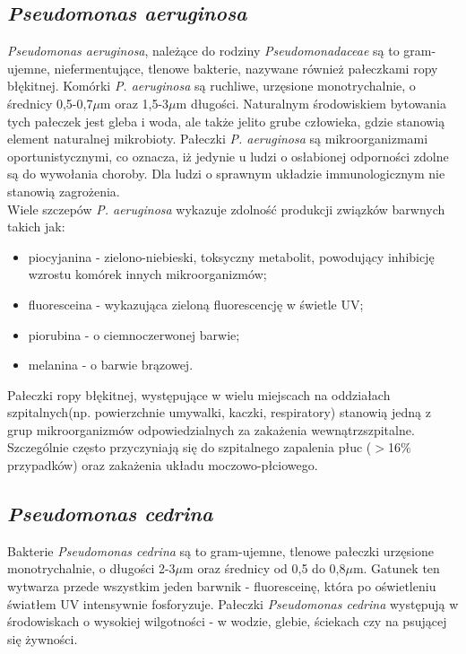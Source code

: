 \documentclass[11pt,a4paper]{report}
\begin{document}
\subsection{\textit{Pseudomonas aeruginosa}}
\textit{Pseudomonas aeruginosa}, należące do rodziny \textit{Pseudomonadaceae} są to gram-ujemne, niefermentujące, tlenowe bakterie, nazywane również pałeczkami ropy błękitnej. Komórki \textit{P. aeruginosa} są ruchliwe, urzęsione monotrychalnie, o średnicy 0,5-0,7$\mu$m oraz 1,5-3$\mu$m długości\cite{ps_aer_ksiazka, medical_micro}.
Naturalnym środowiskiem bytowania tych pałeczek jest gleba i woda, ale także jelito grube człowieka, gdzie stanowią element naturalnej mikrobioty.
Pałeczki \textit{P. aeruginosa} są mikroorganizmami oportunistycznymi, co oznacza, iż jedynie u ludzi o osłabionej odporności zdolne są do wywołania choroby. Dla ludzi o sprawnym układzie immunologicznym nie stanowią zagrożenia\cite{ps_aer_ksiazka}.\\
Wiele szczepów \textit{P. aeruginosa} wykazuje zdolność produkcji związków barwnych takich jak:
\begin{itemize}
\item piocyjanina - zielono-niebieski, toksyczny metabolit, powodujący inhibicję wzrostu komórek innych mikroorganizmów;
\item fluoresceina - wykazująca zieloną fluorescencję w świetle UV;
\item piorubina - o ciemnoczerwonej barwie;
\item melanina - o barwie brązowej\cite{pio, pio2, fluor}.
\end{itemize}
Pałeczki ropy błękitnej, występujące w wielu miejscach na oddziałach szpitalnych(np. powierzchnie umywalki, kaczki, respiratory) stanowią jedną z grup mikroorganizmów odpowiedzialnych za zakażenia wewnątrzszpitalne. Szczególnie często przyczyniają się do szpitalnego zapalenia płuc ($>$16$\%$ przypadków) oraz zakażenia układu moczowo-płciowego\cite{zakszpit16}.

\subsection{\textit{Pseudomonas cedrina}}
Bakterie \textit{Pseudomonas cedrina} są to gram-ujemne, tlenowe pałeczki urzęsione monotrychalnie, o długości 2-3$\mu$m oraz średnicy od 0,5 do 0,8$\mu$m. 
Gatunek ten wytwarza przede wszystkim jeden barwnik - fluoresceinę, która po oświetleniu światłem UV intensywnie fosforyzuje. Pałeczki \textit{Pseudomonas cedrina} występują w środowiskach o wysokiej wilgotności - w wodzie, glebie, ściekach czy na psującej się żywności\cite{cedrina, ps_aer_ksiazka}.
 
\end{document}
